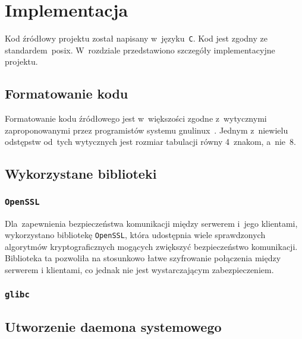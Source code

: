 \documentclass[thesis]{subfiles}
\begin{document}
\chapter{Implementacja}
\label{chapter:implementacja}

Kod źródłowy projektu został napisany w~języku~\texttt{C}. Kod jest zgodny ze standardem~\gls{posix}. W~rozdziale przedstawiono szczegóły implementacyjne projektu.

\section{Formatowanie kodu}

Formatowanie kodu źródłowego jest w~większości zgodne z~wytycznymi zaproponowanymi przez programistów  systemu \gls{gnulinux}~\cite{kernel-coding-style}. Jednym z~niewielu odstępstw od~tych wytycznych jest rozmiar tabulacji równy 4~znakom, a~nie~8.


\section{Wykorzystane biblioteki}
\subsection{\texttt{OpenSSL}}

Dla~zapewnienia bezpieczeństwa komunikacji między serwerem i~jego klientami, wykorzystano bibliotekę \texttt{OpenSSL}, która udostępnia wiele sprawdzonych algorytmów kryptograficznych mogących zwiększyć bezpieczeństwo komunikacji. Biblioteka ta pozwoliła na stosunkowo łatwe szyfrowanie połączenia między serwerem i klientami, co jednak nie jest wystarczającym zabezpieczeniem. %

\subsection{\texttt{glibc}}


\section{Utworzenie daemona systemowego}
\end{document}
